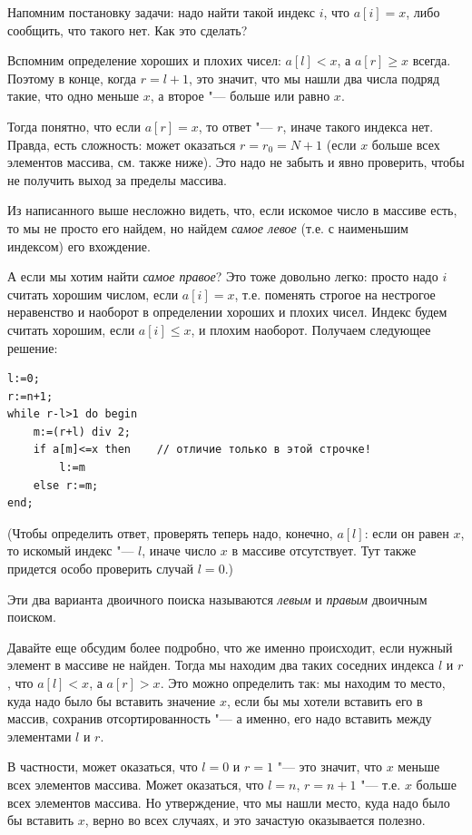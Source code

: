 \documentclass[a4paper,10pt]{problems}
\begin{document}
Напомним постановку задачи: надо найти такой индекс $i$, что $a[i]=x$, либо сообщить,
что такого нет. Как это сделать?

Вспомним определение хороших и плохих чисел: $a[l]<x$, а $a[r]\geq x$ всегда.
Поэтому в конце, когда $r=l+1$, это значит, что мы нашли два числа подряд такие,
что одно меньше $x$, а второе "--- больше или равно $x$.

Тогда понятно, что если $a[r]=x$, то ответ "--- $r$, иначе такого индекса нет.
Правда, есть сложность: может оказаться $r=r_0=N+1$ (если $x$ больше всех элементов массива, см. также ниже). 
Это надо не забыть и явно проверить, чтобы не получить выход за пределы массива.

Из написанного выше несложно видеть, что, если искомое число в массиве есть, то мы не просто его найдем,
но найдем \textit{самое левое} (т.е. с наименьшим индексом) его вхождение.

А если мы хотим найти \textit{самое правое}? 
Это тоже довольно легко: просто надо $i$ считать хорошим числом, если $a[i]=x$, 
т.е. поменять строгое на нестрогое неравенство и наоборот в определении хороших и плохих чисел.
Индекс будем считать хорошим, если $a[i]\leq x$, и плохим наоборот. Получаем следующее решение:
\begin{codesampleo}\begin{verbatim}
l:=0;
r:=n+1;  
while r-l>1 do begin    
    m:=(r+l) div 2;
    if a[m]<=x then    // отличие только в этой строчке!
        l:=m
    else r:=m;
end;
\end{verbatim}
\end{codesampleo}
(Чтобы определить ответ, проверять теперь надо, конечно, $a[l]$: если он равен $x$, 
то искомый индекс "--- $l$,  иначе число $x$ в массиве отсутствует. Тут также придется особо проверить случай $l=0$.)

Эти два варианта двоичного поиска называются \textit{левым} и \textit{правым} двоичным поиском.

Давайте еще обсудим более подробно, что же именно происходит, если нужный элемент в массиве не найден.
Тогда мы находим два таких соседних индекса $l$ и $r$, что $a[l]<x$, а $a[r]>x$.
Это можно определить так: мы находим то место, куда надо было бы вставить значение $x$, 
если бы мы хотели вставить его в массив, сохранив отсортированность "--- а именно,
его надо вставить между элементами $l$ и $r$.

В частности, может оказаться, что $l=0$ и $r=1$ "--- это значит, что $x$ меньше всех элементов массива.
Может оказаться, что $l=n$, $r=n+1$ "--- т.е. $x$ больше всех элементов массива.
Но утверждение, что мы нашли место, куда надо было бы вставить $x$, верно во всех случаях, 
и это зачастую оказывается полезно.
\end{document}
